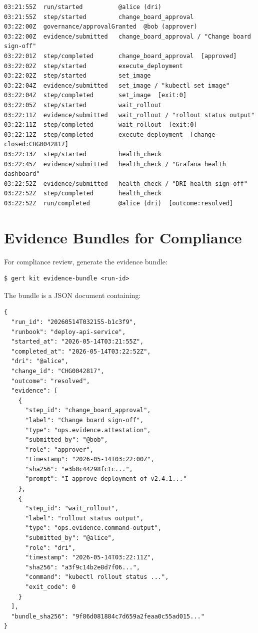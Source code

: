 \begin{verbatim}
03:21:55Z  run/started          @alice (dri)
03:21:55Z  step/started         change_board_approval
03:22:00Z  governance/approvalGranted  @bob (approver)
03:22:00Z  evidence/submitted   change_board_approval / "Change board sign-off"
03:22:01Z  step/completed       change_board_approval  [approved]
03:22:02Z  step/started         execute_deployment
03:22:02Z  step/started         set_image
03:22:04Z  evidence/submitted   set_image / "kubectl set image"
03:22:04Z  step/completed       set_image  [exit:0]
03:22:05Z  step/started         wait_rollout
03:22:11Z  evidence/submitted   wait_rollout / "rollout status output"
03:22:11Z  step/completed       wait_rollout  [exit:0]
03:22:12Z  step/completed       execute_deployment  [change-closed:CHG0042817]
03:22:13Z  step/started         health_check
03:22:45Z  evidence/submitted   health_check / "Grafana health dashboard"
03:22:52Z  evidence/submitted   health_check / "DRI health sign-off"
03:22:52Z  step/completed       health_check
03:22:52Z  run/completed        @alice (dri)  [outcome:resolved]
\end{verbatim}

\section{Evidence Bundles for Compliance}
\label{sec:evidence-bundles}

For compliance review, generate the evidence bundle:

\begin{verbatim}
$ gert kit evidence-bundle <run-id>
\end{verbatim}

The bundle is a JSON document containing:

\begin{verbatim}
{
  "run_id": "20260514T032155-b1c3f9",
  "runbook": "deploy-api-service",
  "started_at": "2026-05-14T03:21:55Z",
  "completed_at": "2026-05-14T03:22:52Z",
  "dri": "@alice",
  "change_id": "CHG0042817",
  "outcome": "resolved",
  "evidence": [
    {
      "step_id": "change_board_approval",
      "label": "Change board sign-off",
      "type": "ops.evidence.attestation",
      "submitted_by": "@bob",
      "role": "approver",
      "timestamp": "2026-05-14T03:22:00Z",
      "sha256": "e3b0c44298fc1c...",
      "prompt": "I approve deployment of v2.4.1..."
    },
    {
      "step_id": "wait_rollout",
      "label": "rollout status output",
      "type": "ops.evidence.command-output",
      "submitted_by": "@alice",
      "role": "dri",
      "timestamp": "2026-05-14T03:22:11Z",
      "sha256": "a3f9c14b2e8d7f06...",
      "command": "kubectl rollout status ...",
      "exit_code": 0
    }
  ],
  "bundle_sha256": "9f86d081884c7d659a2feaa0c55ad015..."
}
\end{verbatim}

